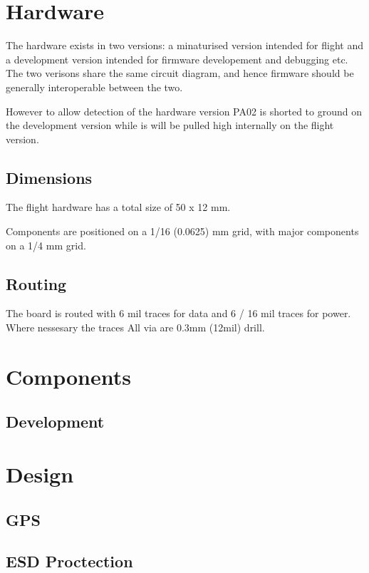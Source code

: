 \documentclass[12pt]{article}
\begin{document}
\section{Hardware}

The hardware exists in two versions: a minaturised version intended
for flight and a development version intended for firmware
developement and debugging etc. The two verisons share the same
circuit diagram, and hence firmware should be generally interoperable
between the two.

However to allow detection of the hardware version PA02 is shorted to
ground on the development version while is will be pulled high
internally on the flight version.

\subsection{Dimensions}

The flight hardware has a total size of 50 x 12 mm.

Components are positioned on a 1/16 (0.0625) mm grid, with major
components on a 1/4 mm grid.

\subsection{Routing}

The board is routed with 6 mil traces for data and 6 / 16 mil traces
for power. Where nessesary the traces  All via are 0.3mm (12mil) drill.

\section{Components}

\subsection{Development}



\section{Design}

\subsection{GPS}


\subsection{ESD Proctection}
\end{document}
